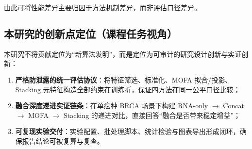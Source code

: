 由此可将性能差异主要归因于方法机制差异，而非评估口径差异。

\subsection{本研究的创新点定位（课程任务视角）}

本研究不将贡献定位为“新算法发明”，而是定位为可审计的研究设计创新与实证创新：

\begin{enumerate}
    \item \textbf{严格防泄露的统一评估协议}：将特征筛选、标准化、MOFA 拟合/投影、Stacking 元特征构造全部约束在训练折，保证四方法在同一公平口径比较；
    \item \textbf{融合深度递进实证链条}：在单癌种 BRCA 场景下构建 RNA-only $\rightarrow$ Concat $\rightarrow$ MOFA $\rightarrow$ Stacking 的递进对比，直接回答“融合是否带来稳定增益”；
    \item \textbf{可复现实验交付}：实验配置、批处理脚本、统计检验与图表导出形成闭环，确保报告结论可被复算与复查。
\end{enumerate}

